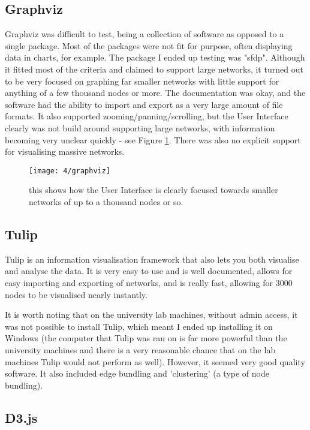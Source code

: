 \documentclass[../dissertation.tex]{subfiles}
\begin{document}
\subsection{Graphviz}

Graphviz was difficult to test, being a collection of software as opposed to a single package. Most of the packages were not fit for purpose, often displaying data in charts, for example. The package I ended up testing was "sfdp". Although it fitted most of the criteria and claimed to support large networks, it turned out to be very focused on graphing far smaller networks with little support for anything of a few thousand nodes or more. The documentation was okay, and the software had the ability to import and export as a very large amount of file formats. It also supported zooming/panning/scrolling, but the User Interface clearly was not build around supporting large networks, with information becoming very unclear quickly - see Figure \ref{fig:graphviz}. There was also no explicit support for visualising massive networks.

\begin{figure}
    \centering
    \texttt{[image: 4/graphviz]}
    \caption{this shows how the User Interface is clearly focused towards smaller networks of up to a thousand nodes or so.}
    \label{fig:graphviz}
\end{figure}

\subsection{Tulip}

Tulip is an information visualisation framework that also lets you both visualise and analyse the data. It is very easy to use and is well documented, allows for easy importing and exporting of networks, and is really fast, allowing for 3000 nodes to be visualised nearly instantly. 

It is worth noting that on the university lab machines, without admin access, it was not possible to install Tulip, which meant I ended up installing it on Windows (the computer that Tulip was ran on is far more powerful than the university machines and there is a very reasonable chance that on the lab machines Tulip would not perform as well). However, it seemed very good quality software. It also included edge bundling and 'clustering' (a type of node bundling).

\subsection{D3.js}
\end{document}
